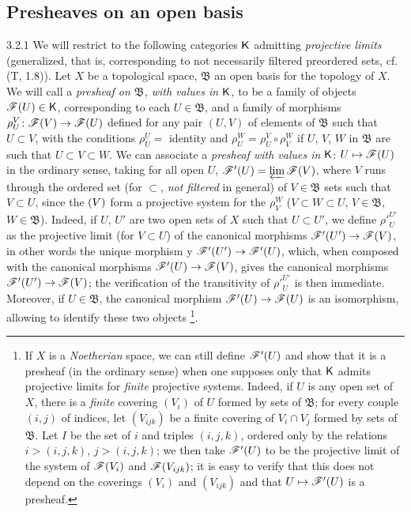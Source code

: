 \documentclass{book}
\begin{document}
\subsection{Presheaves on an open basis}
\label{0-prelim-3.2}

\begin{env}{3.2.1}
\label{env-0.3.2.1}
We will restrict to the following categories $\mathsf{K}$ admitting
\emph{projective limits} (generalized, that is, corresponding to not necessarily filtered preordered sets,
cf. (T, 1.8)). Let $X$ be a topological space, $\mathfrak{B}$ an open basis
for the topology of $X$. We will call a \emph{presheaf on $\mathfrak{B}$, with values in $\mathsf{K}$,} to be
a family of objects $\mathscr{F}(U)\in\mathsf{K}$, corresponding to each $U\in\mathfrak{B}$, and a family of morphisms
$\rho_U^V\colon\mathscr{F}(V)\to\mathscr{F}(U)$ defined for any pair $(U,V)$ of elements of $\mathfrak{B}$ such that $U\subset V$,
with the conditions $\rho_U^U=$ identity and $\rho_U^W=\rho_U^V\circ\rho_V^W$ if $U$, $V$, $W$ in
$\mathfrak{B}$ are such that $U\subset V\subset W$. We can associate a \emph{presheaf with values in} $\mathsf{K}$: $U\mapsto\mathscr{F}(U)$
in the ordinary sense, taking for all open $U$, $\mathscr{F}'(U)=\varprojlim\mathscr{F}(V)$, where $V$ runs through
the ordered set (for $\subset$, \emph{not filtered} in general) of $V\in\mathfrak{B}$ sets such that $V\subset U$, since
the $\mathscr(V)$ form a projective system for the $\rho_V^W$ ($V\subset W\subset U$, $V\in\mathfrak{B}$, $W\in\mathfrak{B}$).
Indeed, if $U$, $U'$ are two open sets of $X$ such that $U\subset U'$, we define ${\rho'}_U^{U'}$ as the
projective limit (for $V\subset U$) of the canonical morphisms $\mathscr{F}'(U')\to\mathscr{F}(V)$, in other words
the unique morphism y $\mathscr{F}'(U')\to\mathscr{F}'(U)$, which, when composed with the canonical morphisms
$\mathscr{F}'(U)\to\mathscr{F}(V)$, gives the canonical morphisms $\mathscr{F}'(U')\to\mathscr{F}(V)$; the verification of
the transitivity of ${\rho'}_U^{U'}$ is then immediate. Moreover, if $U\in\mathfrak{B}$,
the canonical morphism $\mathscr{F}'(U)\to\mathscr{F}(U)$ is an isomorphism, allowing to identify these two objects
\footnote{
If $X$ is a \emph{Noetherian} space, we can still define $\mathscr{F}'(U)$ and show that it is a presheaf (in the
ordinary sense) when one supposes only that $\mathsf{K}$ admits projective limits for \emph{finite} projective systems. Indeed,
if $U$ is any open set of $X$, there is a \emph{finite} covering $(V_i)$ of $U$ formed by sets of $\mathfrak{B}$; for every
couple $(i,j)$ of indices, let $(V_{ijk})$ be a finite covering of $V_i\cap V_j$ formed by sets of $\mathfrak{B}$. Let $I$ be the set
of $i$ and triples $(i,j,k)$, ordered only by the relations $i>(i,j,k)$, $j>(i,j,k)$; we then take $\mathscr{F}'(U)$ to be
the projective limit of the system of $\mathscr{F}(V_i)$ and $\mathscr{F}(V_{ijk})$; it is easy to verify that this does not depend on the
coverings $(V_i)$ and $(V_{ijk})$ and that $U\mapsto\mathscr{F}'(U)$ is a presheaf.}.
\end{env}
\end{document}
